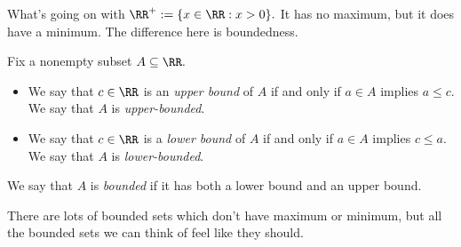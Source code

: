What's going on with $\RR^+:=\{x\in\RR:x>0\}.$ It has no maximum, but it does have a minimum. The difference here is boundedness.
\begin{defi}[Boundedness]
	Fix a nonempty subset $A\subseteq\RR.$
	\begin{itemize}
		\item We say that $c\in\RR$ is an \textit{upper bound} of $A$ if and only if $a\in A$ implies $a\le c.$ We say that $A$ is \textit{upper-bounded}.
		\item We say that $c\in\RR$ is a \textit{lower bound} of $A$ if and only if $a\in A$ implies $c\le a.$ We say that $A$ is \textit{lower-bounded}.
	\end{itemize}
	We say that $A$ is \textit{bounded} if it has both a lower bound and an upper bound.
\end{defi}
There are lots of bounded sets which don't have maximum or minimum, but all the bounded sets we can think of feel like they should.

